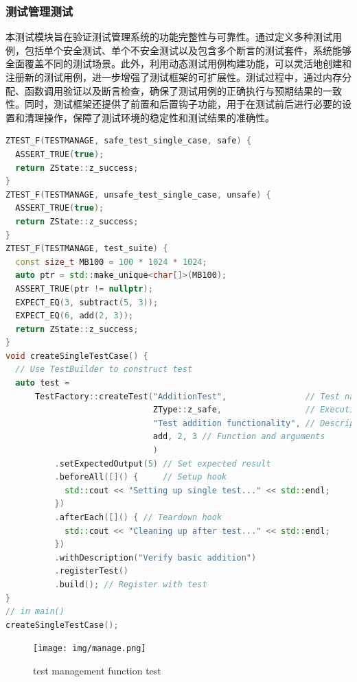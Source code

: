 \documentclass{article}
\begin{document}
\subsubsection{测试管理测试}
本测试模块旨在验证测试管理系统的功能完整性与可靠性。通过定义多种测试用例，包括单个安全测试、单个不安全测试以及包含多个断言的测试套件，系统能够全面覆盖不同的测试场景。此外，利用动态测试用例构建功能，可以灵活地创建和注册新的测试用例，进一步增强了测试框架的可扩展性。测试过程中，通过内存分配、函数调用验证以及断言检查，确保了测试用例的正确执行与预期结果的一致性。同时，测试框架还提供了前置和后置钩子功能，用于在测试前后进行必要的设置和清理操作，保障了测试环境的稳定性和测试结果的准确性。
\begin{framed}
    \begin{lstlisting}[language=C++]
ZTEST_F(TESTMANAGE, safe_test_single_case, safe) {
  ASSERT_TRUE(true);
  return ZState::z_success;
}
ZTEST_F(TESTMANAGE, unsafe_test_single_case, unsafe) {
  ASSERT_TRUE(true);
  return ZState::z_success;
}
ZTEST_F(TESTMANAGE, test_suite) {
  const size_t MB100 = 100 * 1024 * 1024;
  auto ptr = std::make_unique<char[]>(MB100);
  ASSERT_TRUE(ptr != nullptr);
  EXPECT_EQ(3, subtract(5, 3));
  EXPECT_EQ(6, add(2, 3));
  return ZState::z_success;
}
void createSingleTestCase() {
  // Use TestBuilder to construct test
  auto test =
      TestFactory::createTest("AdditionTest",                // Test name
                              ZType::z_safe,                 // Execution
                              "Test addition functionality", // Description
                              add, 2, 3 // Function and arguments
                              )
          .setExpectedOutput(5) // Set expected result
          .beforeAll([]() {     // Setup hook
            std::cout << "Setting up single test..." << std::endl;
          })
          .afterEach([]() { // Teardown hook
            std::cout << "Cleaning up after test..." << std::endl;
          })
          .withDescription("Verify basic addition")
          .registerTest()
          .build(); // Register with test
}
// in main()
createSingleTestCase();

\end{lstlisting}
\end{framed}
\begin{figure}[H]
    \centering
    \texttt{[image: img/manage.png]} %
    \caption{test management function test}
    \label{fig:test management function test}
\end{figure}
\newpage
\end{document}
